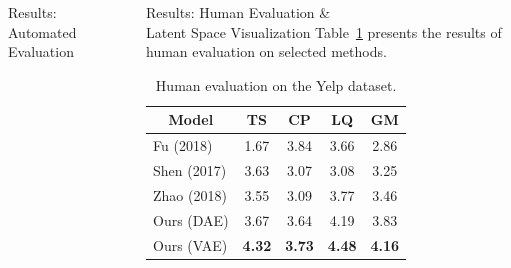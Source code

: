 \documentclass[final]{beamer}
\newlength{\onecolwid}
\newlength{\twocolwid}
\newcommand{\tabc}[2]{\multicolumn{1}{c}{\multirow{#1}{*}{\textbf{#2}}}}
\begin{document}
\begin{frame}[t]
\begin{columns}[t]
\begin{column}{\twocolwid}
\begin{columns}[t,totalwidth=\twocolwid]
\begin{column}{\onecolwid}
\begin{block}{Results: Automated Evaluation}
                    \end{block}


                \end{column} %

                \begin{column}{\onecolwid} %

                    \begin{block}{Results: Human Evaluation \&\\Latent Space Visualization}
                        Table~\ref{tab:human-evaluation} presents the results of human evaluation on selected methods.

                        \begin{table}[ht]
                            \centering
                            \begin{tabular}{ l c c c c }
                                \tabc{1}{Model} & \textbf{TS}       & \textbf{CP}       & \textbf{LQ}       & \textbf{GM}       \\
                                \hline
                                Fu (2018)       & \color{gray} 1.67 & \color{gray} 3.84 & \color{gray} 3.66 & \color{gray} 2.86 \\
                                Shen (2017)     & 3.63              & 3.07              & 3.08              & 3.25              \\
                                Zhao (2018)     & 3.55              & 3.09              & 3.77              & 3.46              \\
                                Ours (DAE)      & 3.67              & 3.64              & 4.19              & 3.83              \\
                                Ours (VAE)      & \textbf{4.32}     & \textbf{3.73}     & \textbf{4.48}     & \textbf{4.16}     \\
                            \end{tabular}
                            \caption{Human evaluation on the Yelp dataset.}
                            \label{tab:human-evaluation}
                        \end{table}

                        \vspace{-1.6cm}


\end{block}
\end{column}
\end{columns}
\end{column}
\end{columns}
\end{frame}
\end{document}
